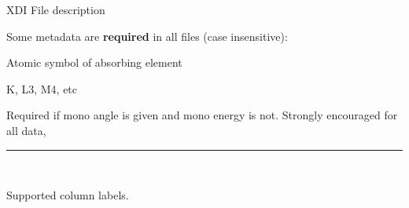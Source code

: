 \documentclass[final]{beamer}
\newcommand{\Color}[2]{{\textcolor{#1}{#2}}}
\newcommand{\Blue}[1]{{\Color{Blue}{\bf{#1}}}}
\begin{document}
\begin{frame}{}
\begin{columns}[t]
\begin{column}{.42\linewidth}
        \vspace{2mm}
        \begin{block}{\large XDI File description}

          \justifying
          Some metadata are \textbf{required} in all files (case insensitive):

         \begin{center}
           \begin{minipage}[t]{0.95\linewidth}
             \begin{description}[Mono]
             \item[\Blue{Element.symbol}]  Atomic symbol of absorbing element
             \item[\Blue{Element.edge}]    K, L3, M4, etc
             \item[\Blue{Mono.d\_spacing}]  Required if mono angle is given and mono energy is not.
               Strongly encouraged for all data,
             \end{description}
           \end{minipage}
         \end{center}

         \vspace{3mm}

          \hrule

          \vspace{3mm} {\ }
          
          Supported column labels.  


\end{block}
\end{column}
\end{columns}
\end{frame}
\end{document}
